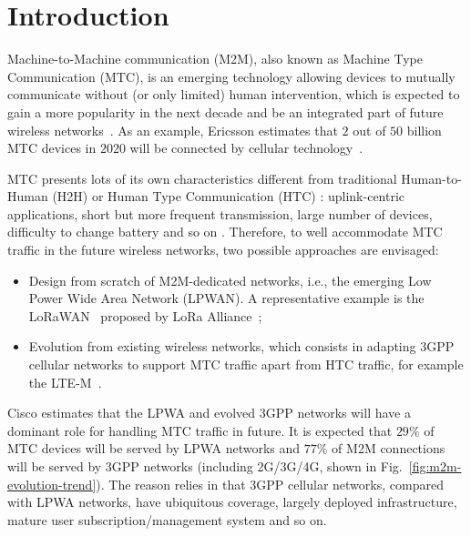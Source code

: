 \section{Introduction}
Machine-to-Machine communication (M2M), also known as Machine Type Communication (MTC), is an emerging technology allowing devices to mutually communicate without (or only limited) human intervention, which is expected to gain a more popularity in the next decade and be an integrated part of future wireless networks~\cite{3GPP/service-requirement}\cite{3GPP/ranimprovements}. As an example, Ericsson estimates that $2$ out of $50$ billion MTC devices in $2020$ will be connected by cellular technology~\cite{Eri11}. 

MTC presents lots of its own characteristics different from traditional Human-to-Human (H2H) or Human Type Communication (HTC) : uplink-centric applications, short but more frequent transmission, large number of devices, difficulty to change battery and so on \cite{FirstLook12}. Therefore, to well accommodate MTC traffic in the future wireless networks, two possible approaches are envisaged: \begin{itemize}[leftmargin=*, noitemsep]
	\item Design from scratch of M2M-dedicated networks, i.e., the emerging Low Power Wide Area Network (LPWAN). A representative example is the LoRaWAN~\cite{lora/specification} proposed by LoRa Alliance~\cite{lora_alliance};
	\item Evolution from existing wireless networks, which consists in adapting 3GPP cellular networks to support MTC traffic apart from HTC traffic, for example the LTE-M~\cite{ratasuk2014narrowband}.
\end{itemize}
Cisco estimates that the LPWA  and evolved 3GPP networks will have a dominant role for handling MTC traffic in future. It is expected that $29\%$ of MTC devices will be served by LPWA networks and $77\%$ of M2M connections will be served by 3GPP networks (including 2G/3G/4G, shown in Fig.~\ref{fig:m2m-evolution-trend}). The reason relies in that 3GPP cellular networks, compared with LPWA networks, have ubiquitous coverage, largely deployed infrastructure, mature user subscription/management system and so on. 

